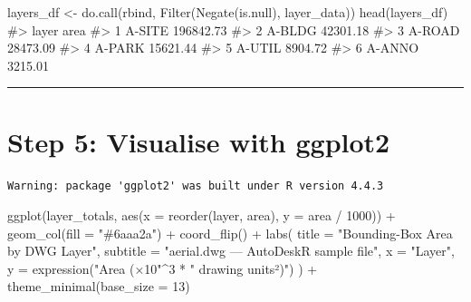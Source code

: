 \documentclass[
  11pt,
  letterpaper,
  DIV=11,
  numbers=noendperiod]{scrreprt}
\newenvironment{Shaded}{\begin{snugshade}}{\end{snugshade}}
\newcommand{\AttributeTok}[1]{\textcolor[rgb]{0.40,0.45,0.13}{#1}}
\newcommand{\CommentTok}[1]{\textcolor[rgb]{0.37,0.37,0.37}{#1}}
\newcommand{\DecValTok}[1]{\textcolor[rgb]{0.68,0.00,0.00}{#1}}
\newcommand{\FunctionTok}[1]{\textcolor[rgb]{0.28,0.35,0.67}{#1}}
\newcommand{\NormalTok}[1]{\textcolor[rgb]{0.00,0.23,0.31}{#1}}
\newcommand{\OtherTok}[1]{\textcolor[rgb]{0.00,0.23,0.31}{#1}}
\newcommand{\SpecialCharTok}[1]{\textcolor[rgb]{0.37,0.37,0.37}{#1}}
\newcommand{\StringTok}[1]{\textcolor[rgb]{0.13,0.47,0.30}{#1}}
\begin{document}
\begin{Shaded}
\begin{Highlighting}[]
\NormalTok{layers\_df }\OtherTok{\textless{}{-}} \FunctionTok{do.call}\NormalTok{(rbind, }\FunctionTok{Filter}\NormalTok{(}\FunctionTok{Negate}\NormalTok{(is.null), layer\_data))}
\FunctionTok{head}\NormalTok{(layers\_df)}
\CommentTok{\#\textgreater{}     layer        area}
\CommentTok{\#\textgreater{} 1  A{-}SITE  196842.73}
\CommentTok{\#\textgreater{} 2  A{-}BLDG   42301.18}
\CommentTok{\#\textgreater{} 3  A{-}ROAD   28473.09}
\CommentTok{\#\textgreater{} 4  A{-}PARK   15621.44}
\CommentTok{\#\textgreater{} 5  A{-}UTIL    8904.72}
\CommentTok{\#\textgreater{} 6  A{-}ANNO    3215.01}
\end{Highlighting}
\end{Shaded}

\begin{center}\rule{0.5\linewidth}{0.5pt}\end{center}

\section{Step 5: Visualise with
ggplot2}\label{step-5-visualise-with-ggplot2}

\begin{verbatim}
Warning: package 'ggplot2' was built under R version 4.4.3
\end{verbatim}

\begin{Shaded}
\begin{Highlighting}[]
\FunctionTok{ggplot}\NormalTok{(layer\_totals, }\FunctionTok{aes}\NormalTok{(}\AttributeTok{x =} \FunctionTok{reorder}\NormalTok{(layer, area), }\AttributeTok{y =}\NormalTok{ area }\SpecialCharTok{/} \DecValTok{1000}\NormalTok{)) }\SpecialCharTok{+}
  \FunctionTok{geom\_col}\NormalTok{(}\AttributeTok{fill =} \StringTok{"\#6aaa2a"}\NormalTok{) }\SpecialCharTok{+}
  \FunctionTok{coord\_flip}\NormalTok{() }\SpecialCharTok{+}
  \FunctionTok{labs}\NormalTok{(}
    \AttributeTok{title    =} \StringTok{"Bounding{-}Box Area by DWG Layer"}\NormalTok{,}
    \AttributeTok{subtitle =} \StringTok{"aerial.dwg — AutoDeskR sample file"}\NormalTok{,}
    \AttributeTok{x        =} \StringTok{"Layer"}\NormalTok{,}
    \AttributeTok{y        =} \FunctionTok{expression}\NormalTok{(}\StringTok{"Area (×10"}\SpecialCharTok{\^{}}\DecValTok{3} \SpecialCharTok{*} \StringTok{" drawing units²)"}\NormalTok{)}
\NormalTok{  ) }\SpecialCharTok{+}
  \FunctionTok{theme\_minimal}\NormalTok{(}\AttributeTok{base\_size =} \DecValTok{13}\NormalTok{)}
\end{Highlighting}
\end{Shaded}
\end{document}
